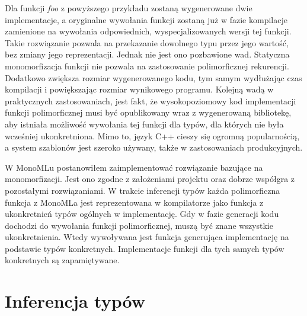 \documentclass[declaration,shortabstract]{iithesis}
\begin{document}
Dla funkcji \textit{foo} z powyższego przykładu zostaną wygenerowane dwie 
implementacje, a oryginalne wywołania funkcji zostaną już w fazie kompilacje
zamienione na wywołania odpowiednich, wyspecjalizowanych wersji tej funkcji.
Takie rozwiązanie pozwala na przekazanie dowolnego typu przez jego wartość, 
bez zmiany jego reprezentacji. Jednak nie jest ono pozbawione wad. 
Statyczna monomorfizacja funkcji nie pozwala na zastosowanie polimorficznej
rekurencji. Dodatkowo zwiększa rozmiar wygenerowanego kodu, tym samym 
wydłużając czas kompilacji i powiększając rozmiar wynikowego programu. Kolejną 
wadą w praktycznych zastosowaniach, jest fakt, że wysokopoziomowy kod 
implementacji funkcji polimorficznej musi być opublikowany wraz z wygenerowaną 
bibliotekę, aby istniała możliwość wywołania tej funkcji dla typów, dla 
których nie była wcześniej ukonkretniona. Mimo to, język C++ cieszy 
się ogromną popularnością, a system szablonów jest szeroko używany, także w 
zastosowaniach produkcyjnych. 

W MonoMLu postanowiłem zaimplementować rozwiązanie bazujące na 
monomorfizacji. Jest ono zgodne z założeniami projektu oraz dobrze współgra z 
pozostałymi rozwiązaniami. W trakcie inferencji typów każda polimorficzna 
funkcja z MonoMLa jest reprezentowana w kompilatorze jako funkcja z 
ukonkretnień typów ogólnych w implementację. Gdy w fazie generacji kodu 
dochodzi do wywołania funkcji polimorficznej, muszą być znane wszystkie 
ukonkretnienia. Wtedy wywoływana jest funkcja generująca implementację na 
podstawie typów konkretnych. Implementacje funkcji dla tych samych typów 
konkretnych są zapamiętywane.



\section{Inferencja typów}
\end{document}
